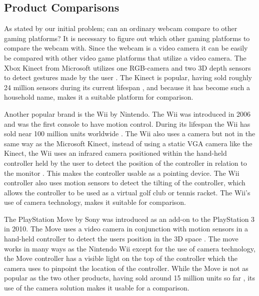 \subsection{Product Comparisons}
As stated by our initial problem; can an ordinary webcam compare to other gaming platforms? It is necessary to figure out which other gaming platforms to compare the webcam with. Since the webcam is a video camera it can be easily be compared with other video game platforms that utilize a video camera. The Xbox Kinect from Microsoft utilizes one RGB-camera and two 3D depth sensors to detect gestures made by the user \parencite{Cong}. The Kinect is popular, having sold roughly 24 million sensors during its current lifespan \parencite{MSByNumbers}, and because it has become such a household name, makes it a suitable platform for comparison.
\bigskip

Another popular brand is the Wii by Nintendo. The Wii was introduced in 2006 and was the first console to have motion control. During its lifespan the Wii has sold near 100 million units worldwide \parencite{NintendoSales}. The Wii also uses a camera but not in the same way as the Microsoft Kinect, instead of using a static VGA camera like the Kinect, the Wii uses an infrared camera positioned within the hand-held controller held by the user to detect the position of the controller in relation to the monitor \parencite{Castaneda2006}. This makes the controller usable as a pointing device. The Wii controller also uses motion sensors to detect the tilting of the controller, which allows the controller to be used as a virtual golf club or tennis racket. The Wii's use of camera technology, makes it suitable for comparison.
\bigskip

The PlayStation Move by Sony was introduced as an add-on to the PlayStation 3 in 2010. The Move uses a video camera in conjunction with motion sensors in a hand-held controller to detect the users position in the 3D space \parencite{Kumar2009}. The move works in many ways as the Nintendo Wii except for the use of camera technology, the Move controller has a visible light on the top of the controller which the camera uses to pinpoint the location of the controller. While the Move is not as popular as the two other products, having sold around 15 million units so far \parencite{Yin-Poole2012}, its use of the camera solution makes it usable for a comparison.
